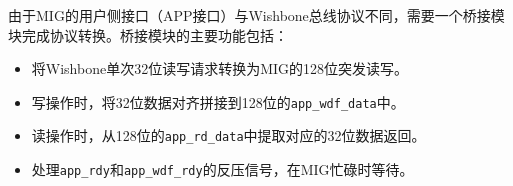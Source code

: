 由于MIG的用户侧接口（APP接口）与Wishbone总线协议不同，需要一个桥接模块完成协议转换。桥接模块的主要功能包括：

\begin{itemize}[leftmargin=2em]
    \item 将Wishbone单次32位读写请求转换为MIG的128位突发读写。
    \item 写操作时，将32位数据对齐拼接到128位的\texttt{app\_wdf\_data}中。
    \item 读操作时，从128位的\texttt{app\_rd\_data}中提取对应的32位数据返回。
    \item 处理\texttt{app\_rdy}和\texttt{app\_wdf\_rdy}的反压信号，在MIG忙碌时等待。
\end{itemize}
